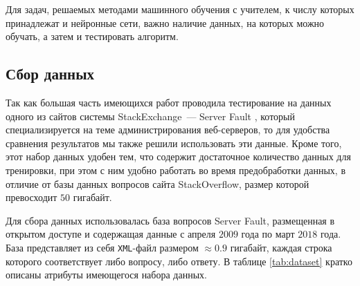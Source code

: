 \documentclass[../diploma.tex]{subfiles}
\begin{document}
	\label{sec:data}

	Для задач, решаемых методами машинного обучения с учителем, к числу которых принадлежат и нейронные сети, важно наличие данных, 
	на которых можно обучать, а затем и тестировать алгоритм.

	\subsection{Сбор данных}

	Так как большая часть имеющихся работ проводила тестирование на данных одного из сайтов системы StackExchange~--- Server Fault \cite{online:serverfault}, 
	который специализируется на теме администрирования веб-серверов,
	то для удобства сравнения результатов мы также решили использовать эти данные.
	Кроме того, этот набор данных удобен тем, что содержит достаточное количество данных для тренировки, при этом с ним удобно работать во время предобработки данных,
	в отличие от базы данных вопросов сайта StackOverflow, размер которой превосходит $50$ гигабайт.

	Для сбора данных использовалась база вопросов Server Fault, 
	размещенная в открытом доступе \cite{online:dataset} и содержащая данные с апреля $2009$ года по март $2018$ года.
	База представляет из себя \texttt{XML}-файл размером $\approx 0.9$ гигабайт, каждая строка которого соответствует либо вопросу, либо ответу.
	В таблице \ref{tab:dataset} кратко описаны атрибуты имеющегося набора данных.
\end{document}
